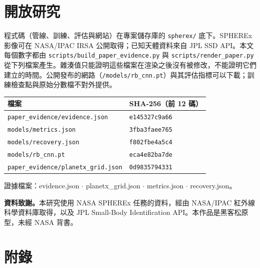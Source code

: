 \documentclass[twocolumn]{aastex631}
\begin{document}
\section*{開放研究}
程式碼（管線、訓練、評估與網站）在專案儲存庫的 \texttt{spherex/} 底下。SPHEREx 影像可在 NASA/IPAC IRSA 公開取得；已知天體資料來自 JPL SSD API。本文每個數字都由 \texttt{scripts/build\_paper\_evidence.py} 與 \texttt{scripts/render\_paper.py} 從下列檔案產生。雜湊值只能證明這些檔案在渲染之後沒有被修改，不能證明它們建立的時間。公開發布的網路（\texttt{/models/rb\_cnn.pt}）與其評估指標可以下載；訓練檢查點與原始分數檔不對外提供。

\begin{table}[t]
\centering
\footnotesize

\begin{tabularx}{\columnwidth}{Xl}
\hline\hline
檔案 & SHA-256（前 12 碼） \\
\hline
\texttt{paper\_evidence/evidence.json} & \texttt{e145327c9a66} \\
\texttt{models/metrics.json} & \texttt{3fba3faee765} \\
\texttt{models/recovery.json} & \texttt{f802fbe4a5c4} \\
\texttt{models/rb\_cnn.pt} & \texttt{eca4e82ba7de} \\
\texttt{paper\_evidence/planetx\_grid.json} & \texttt{0d9835794331} \\
\hline
\end{tabularx}
\end{table}
證據檔案：evidence.json $\cdot$ planetx\_grid.json $\cdot$ metrics.json $\cdot$ recovery.json。

\textbf{資料致謝。}本研究使用 NASA SPHEREx 任務的資料，經由 NASA/IPAC 紅外線科學資料庫取得，以及 JPL Small-Body Identification API。本作品是黑客松原型，未經 NASA 背書。

\section*{附錄}
\end{document}
